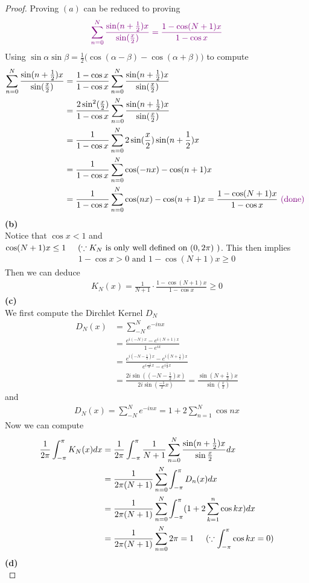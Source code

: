 \documentclass{report}
\begin{document}
\begin{proof}
Proving $(a)$ can be reduced to proving 
\begin{align*}
\textcolor{violet}{\sum_{n=0}^N \frac{\sin (n+\frac{1}{2})x}{\sin (\frac{x}{2})}=\frac{1- \cos (N+1)x}{1-\cos x}}
\end{align*}
Using $\sin \alpha \sin \beta = \frac{1}{2}\Big(\cos (\alpha -\beta )-\cos (\alpha +\beta ) \Big)$ to compute 
\begin{align*}
\sum_{n=0}^N \frac{\sin (n+\frac{1}{2})x}{\sin (\frac{x}{2})}&= \frac{1-\cos x}{1- \cos x} \sum_{n=0}^N \frac{\sin (n+\frac{1}{2})x}{\sin (\frac{x}{2})}\\
&=\frac{2 \sin^2 (\frac{x}{2})}{1- \cos x} \sum_{n=0}^N \frac{\sin (n+\frac{1}{2})x}{\sin (\frac{x}{2})}\\
&=\frac{1}{1-\cos x}\sum_{n=0}^N 2\sin(\frac{x}{2})\sin (n+\frac{1}{2})x\\
&=\frac{1}{1- \cos x}\sum_{n=0}^N \cos (-nx)- \cos (n+1)x\\
&=\frac{1}{1- \cos x}\sum_{n=0}^N \cos (nx)- \cos (n+1)x=\frac{1- \cos (N+1)x}{1- \cos x}\textcolor{violet}{\text{ (done) }}
\end{align*}
\textbf{(b)}\\

Notice that $\cos x < 1$ and $\cos (N+1)x\leq 1\hspace{0.5cm}(\because K_N\text{ is only well defined on $(0, 2\pi)$ })$. This then implies 
\begin{align*}
1-\cos x>0\text{ and }1-\cos (N+1)x\geq 0
\end{align*}
Then we can deduce 
\begin{align*}
K_N(x)=\frac{1}{N+1}\cdot \frac{1- \cos (N+1)x}{1-\cos x}\geq 0
\end{align*}
\textbf{(c)}\\

We first compute the Dirchlet Kernel $D_N$
\begin{align*}
D_N(x)&=\sum_{-N}^N e^{-i nx}\\
&=\frac{e^{i(-N)x}-e^{i(N+1)x}}{1-e^{ix}}\\
&=\frac{e^{i(-N-\frac{1}{2})x}-e^{i(N+\frac{1}{2})x}}{e^{i\frac{-1}{2}x}-e^{i\frac{1}{2}x}}\\
&=\frac{2i\sin((-N-\frac{1}{2})x)}{2i \sin (\frac{-1}{2}x)}= \frac{\sin (N+\frac{1}{2})x}{\sin (\frac{x}{2})}
\end{align*}
and 
\begin{align*}
D_N(x)=\sum_{-N}^N e^{-i nx}=1+2\sum_{n=1}^N \cos nx 
\end{align*}
Now we can compute 
\begin{align*}
\frac{1}{2\pi}\int_{-\pi}^\pi K_N(x)dx&=\frac{1}{2\pi}\int_{-\pi}^{\pi} \frac{1}{N+1}\sum_{n=0}^N \frac{\sin (n+\frac{1}{2})x}{\sin \frac{x}{2}}dx\\
&=\frac{1}{2\pi (N+1)}\sum_{n=0}^N \int_{-\pi}^{\pi} D_n(x)dx\\
&=\frac{1}{2\pi (N+1)}\sum_{n=0}^N \int_{-\pi}^{\pi} (1+2 \sum_{k=1}^n \cos kx)dx\\
&=\frac{1}{2\pi(N+1)}\sum_{n=0}^N 2\pi=1\hspace{0.5cm}(\because \int_{-\pi}^{\pi}\cos kx=0)
\end{align*}
\textbf{(d)}\\


\end{proof}
\end{document}
